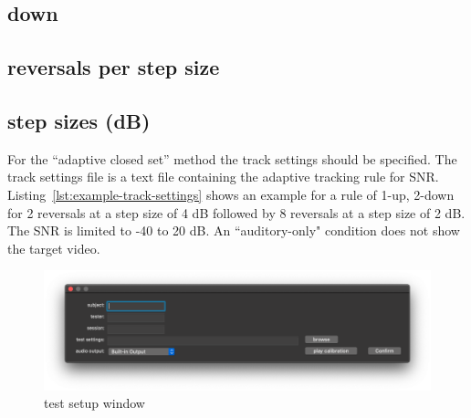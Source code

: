 \documentclass[11pt,pdftex,letterpaper]{article}
\begin{document}
\subsection{down}
\subsection{reversals per step size}
\subsection{step sizes (dB)}
For the ``adaptive closed set'' method the track settings should be specified. The track settings file is a text file containing the adaptive tracking rule for SNR. Listing~\ref{lst:example-track-settings} shows an example for a rule of 1-up, 2-down for 2 reversals at a step size of 4 dB followed by 8 reversals at a step size of 2 dB. The SNR is limited to -40 to 20 dB. An ``auditory-only" condition does not show the target video.

\begin{figure}
\centering
\includegraphics[width = 0.9\linewidth]{test-setup-window.png}
\caption{test setup window}
\label{fig:test-setup-window}
\end{figure}

\noindent\begin{minipage}{\textwidth}

\end{minipage}
\end{document}
